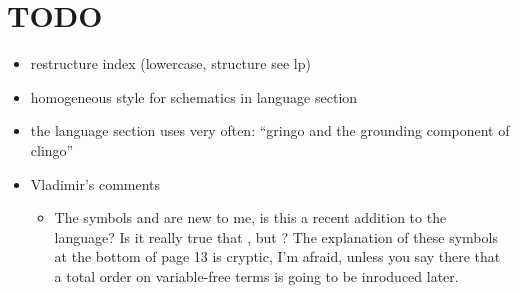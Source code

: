 \section{TODO}
\begin{itemize}
\item restructure index (lowercase, structure see lp)
\item homogeneous style for schematics in language section
\item the language section uses very often: ``gringo and the grounding component of clingo''
\item Vladimir's comments
\begin{itemize}
 \item 
  The symbols  and  are new to me, is this a recent addition to the
  language?  Is it really true that , but ?
  The explanation of these symbols at the bottom of page 13 is cryptic, I’m
  afraid, unless you say there that a total order on variable-free terms is
  going to be inroduced later.

\end{itemize}
\end{itemize}
